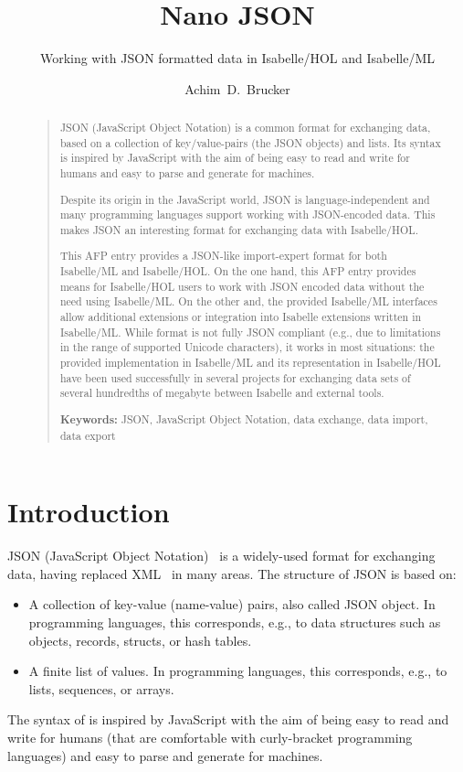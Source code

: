 \documentclass[11pt,DIV=12,a4paper,abstract=true,twoside=semi,openright]
{scrreprt}
\title{Nano JSON}
\subtitle{Working with JSON formatted data in Isabelle/HOL and Isabelle/ML}
\author{Achim~D.~Brucker\textsuperscript{\orcidlink{0000-0002-6355-1200}}}%
\begin{document}
  \maketitle
  \begin{abstract}
    \begin{quote}
      JSON (JavaScript Object Notation) is a common format for exchanging data,
      based on a collection of key/value-pairs (the JSON objects) and lists. Its
      syntax is inspired by JavaScript with the aim of being easy to read and
      write for humans and easy to parse and generate for machines. 
  
      Despite its origin in the JavaScript world, JSON is language-independent
      and many programming languages support working with JSON-encoded data.
      This makes JSON an interesting format for exchanging data with
      Isabelle/HOL.
 
      This AFP entry provides a JSON-like import-expert format for both
      Isabelle/ML and Isabelle/HOL. On the one hand, this AFP entry provides
      means for Isabelle/HOL users to work with JSON encoded data without the
      need using Isabelle/ML. On the other and, the provided Isabelle/ML
      interfaces allow additional extensions or integration into Isabelle
      extensions written in Isabelle/ML. While format is not fully JSON
      compliant (e.g., due to limitations in the range of supported Unicode
      characters), it works in most situations: the provided implementation in
      Isabelle/ML and its representation in Isabelle/HOL have been used
      successfully in several projects for exchanging data sets of several
      hundredths of megabyte between Isabelle and external tools.

      \bigskip
      \noindent\textbf{Keywords:} JSON, JavaScript Object Notation, data
        exchange, data import, data export 
    \end{quote}
  \end{abstract}
\tableofcontents


\chapter{Introduction}
JSON (JavaScript Object Notation)~\cite{ecma:json:2017,ietf:rfc8259-json:2017}
is a widely-used format for exchanging data, having replaced
XML~\cite{bray.ea:extensible:2008} in many areas. The structure of JSON is based
on:
\begin{itemize}
\item A collection of key-value (name-value) pairs, also called JSON object. In
  programming languages, this corresponds, e.g., to data structures such as
  objects, records, structs, or hash tables. 
\item A finite list of values. In programming languages, this corresponds, e.g.,
  to lists, sequences, or arrays. 
\end{itemize}
The syntax of  is inspired by JavaScript with the aim of being easy to read and
write for humans (that are comfortable with curly-bracket programming languages)
and easy to parse and generate for machines. 
\end{document}
